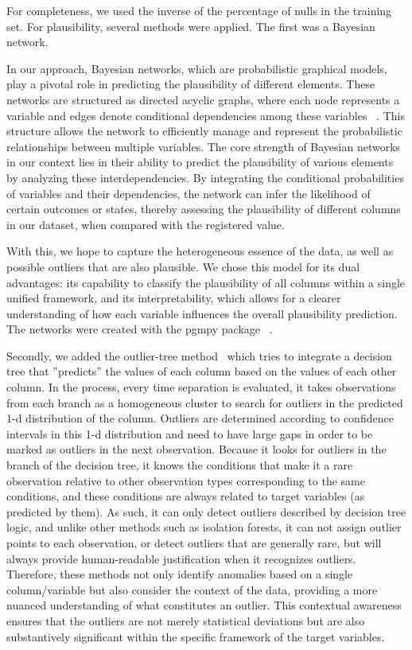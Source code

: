 
For completeness, we used the inverse of the percentage of nulls in the training set. For plausibility, several methods were applied. The first was a Bayesian network. 

In our approach, Bayesian networks, which are probabilistic graphical models, play a pivotal role in predicting the plausibility of different elements. These networks are structured as directed acyclic graphs, where each node represents a variable and edges denote conditional dependencies among these variables \unskip~\cite{pearl1988probabilistic}. This structure allows the network to efficiently manage and represent the probabilistic relationships between multiple variables. The core strength of Bayesian networks in our context lies in their ability to predict the plausibility of various elements by analyzing these interdependencies. By integrating the conditional probabilities of variables and their dependencies, the network can infer the likelihood of certain outcomes or states, thereby assessing the plausibility of different columns in our dataset, when compared with the registered value. 

With this, we hope to capture the heterogeneous essence of the data, as well as possible outliers that are also plausible. We chose this model for its dual advantages: its capability to classify the plausibility of all columns within a single unified framework, and its interpretability, which allows for a clearer understanding of how each variable influences the overall plausibility prediction. The networks were created with the pgmpy package \unskip~\cite{pgmpy}. 

Secondly, we added the outlier-tree method\unskip~\cite{cortesExplainableOutlierDetection2020} which tries to integrate a decision tree that ''predicts'' the values of each column based on the values of each other column. In the process, every time separation is evaluated, it takes observations from each branch as a homogeneous cluster to search for outliers in the predicted 1-d distribution of the column. Outliers are determined according to confidence intervals in this 1-d distribution and need to have large gaps in order to be marked as outliers in the next observation. Because it looks for outliers in the branch of the decision tree, it knows the conditions that make it a rare observation relative to other observation types corresponding to the same conditions, and these conditions are always related to target variables (as predicted by them).  As such, it can only detect outliers described by decision tree logic, and unlike other methods such as isolation forests, it can not assign outlier points to each observation, or detect outliers that are generally rare, but will always provide human-readable justification when it recognizes outliers. Therefore, these methods not only identify anomalies based on a single column/variable but also consider the context of the data, providing a more nuanced understanding of what constitutes an outlier. This contextual awareness ensures that the outliers are not merely statistical deviations but are also substantively significant within the specific framework of the target variables. 

